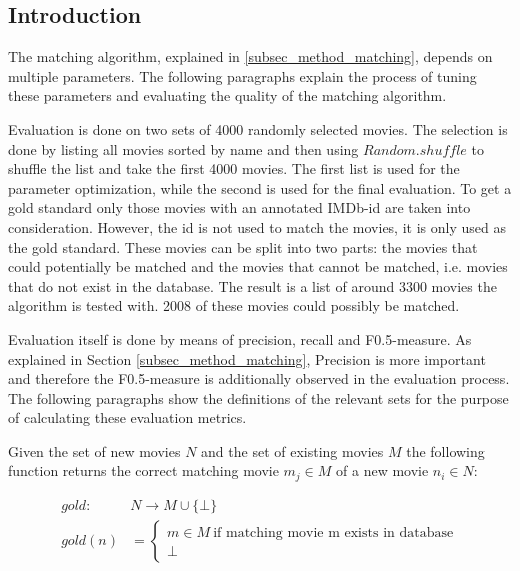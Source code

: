 \label{subsec_evaluation_matching}

\subsection{Introduction}
The matching algorithm, explained in \ref{subsec_method_matching}, depends on multiple parameters.
The following paragraphs explain the process of tuning these parameters and evaluating the quality of the matching algorithm.

Evaluation is done on two sets of 4000 randomly selected movies.
The selection is done by listing all movies sorted by name and then using $Random.shuffle$ to shuffle the list and take the first 4000 movies.
The first list is used for the parameter optimization, while the second is used for the final evaluation.
To get a gold standard only those movies with an annotated IMDb-id are taken into consideration.
However, the id is not used to match the movies, it is only used as the gold standard.
These movies can be split into two parts: the movies that could potentially be matched and the movies that cannot be matched, i.e. movies that do not exist in the database.
The result is a list of around 3300 movies the algorithm is tested with.
2008 of these movies could possibly be matched.

Evaluation itself is done by means of precision, recall and F0.5-measure.
As explained in Section \ref{subsec_method_matching}, Precision is more important and therefore the F0.5-measure is additionally observed in the evaluation process.
The following paragraphs show the definitions of the relevant sets for the purpose of calculating these evaluation metrics.

Given the set of new movies $N$ and the set of existing movies $M$ the following function returns the correct matching movie $m_{j} \in M$ of a new movie $n_{i} \in N$:

\begin{align}
	gold: ~&N \rightarrow M \cup \{\bot\} \\
	gold(n) &=
		\begin{cases}
		m \in M ~\text{if matching movie m exists in database}  \\
		\bot
		\end{cases}
\end{align}

